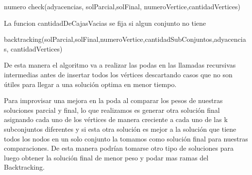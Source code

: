 \begin{algorithm}
  \begin{algorithmic}[1]\parskip=1mm
 \caption{numero check(adyacencias, solParcial,solFinal, numeroVertice,cantidadVertices)}
  \end{algorithmic}
  \end{algorithm}
La funcion cantidadDeCajasVacias se fija si algun conjunto no tiene  
 
 \begin{algorithm}
 \begin{algorithmic}[1]\parskip=1mm
 \caption{backtracking(solParcial,solFinal,numeroVertice,cantidadSubConjuntos,adyacencias, cantidadVertices)}
  \end{algorithmic}
  \end{algorithm}

De esta manera el algoritmo va a realizar las podas en las llamadas recursivas intermedias antes de insertar todos los vértices descartando casos que no son útiles para llegar  a una solución optima en menor tiempo.

Para improvisar una mejora en la poda al comparar los pesos de nuestras soluciones parcial y final, lo que realizamos es generar otra solución final asignando cada uno de los vértices de manera creciente a cada uno de las k subconjuntos diferentes y si esta otra solución es mejor a la solución que tiene todos los nodos en un solo conjunto la tomamos como solución final para nuestras comparaciones.
De esta manera podrían tomarse otro tipo de soluciones para luego obtener la solución final de menor peso y podar mas ramas del Backtracking.	


